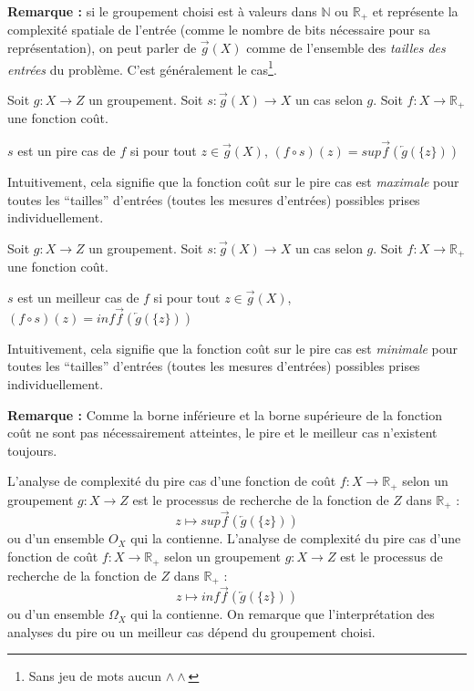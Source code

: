 \documentclass[../../../main.tex]{subfiles}
\begin{document}
\textbf{Remarque :} si le groupement choisi est à valeurs dans $\mathbb{N}$ ou $\mathbb{R}_+$ et représente la complexité spatiale de l'entrée (comme le nombre de bits nécessaire pour sa représentation), on peut parler de $\overrightarrow{g}(X)$ comme de l'ensemble des \textit{tailles des entrées} du problème. C'est généralement le cas\footnote{Sans jeu de mots aucun $\wedge\wedge$}.
 {
	Soit $g:X\rightarrow Z$ un groupement. Soit $s:\overrightarrow{g}(X)\rightarrow X$ un cas selon $g$. Soit $f:X\rightarrow \mathbb{R}_+$ une fonction coût. \newline

	$s$ est un pire cas de $f$ si pour tout $z\in\overrightarrow{g}(X)$, $(f\circ s)(z) = sup \overrightarrow{f}\left(\overleftarrow{g}\left(\{z\}\right)\right)$
}
Intuitivement, cela signifie que la fonction coût sur le pire cas est \textit{maximale} pour toutes les ``tailles'' d'entrées (toutes les mesures d'entrées) possibles prises individuellement.
 {
	Soit $g:X\rightarrow Z$ un groupement. Soit $s:\overrightarrow{g}(X)\rightarrow X$ un cas selon $g$. Soit $f:X\rightarrow \mathbb{R}_+$ une fonction coût. \newline

	$s$ est un meilleur cas de $f$ si pour tout $z\in\overrightarrow{g}(X)$, $(f\circ s)(z) = inf \overrightarrow{f}(\overleftarrow{g}(\{z\}))$
}
Intuitivement, cela signifie que la fonction coût sur le pire cas est \textit{minimale} pour toutes les ``tailles'' d'entrées (toutes les mesures d'entrées) possibles prises individuellement.

\textbf{Remarque :} Comme la borne inférieure et la borne supérieure de la fonction coût ne sont pas nécessairement atteintes, le pire et le meilleur cas n'existent toujours.

 {
	L'analyse de complexité du pire cas d'une fonction de coût $f:X\rightarrow \mathbb{R}_+$ selon un groupement $g:X\rightarrow Z$ est le processus de recherche de la fonction de $Z$ dans $\mathbb{R}_+$ :
	$$z\mapsto sup \overrightarrow{f}\left(\overleftarrow{g}\left(\{z\}\right)\right)$$
	ou d'un ensemble $O_X$ qui la contienne.
}
 {
	L'analyse de complexité du pire cas d'une fonction de coût $f:X\rightarrow \mathbb{R}_+$ selon un groupement $g:X\rightarrow Z$ est le processus de recherche de la fonction de $Z$ dans $\mathbb{R}_+$ :
	$$z\mapsto inf \overrightarrow{f}\left(\overleftarrow{g}\left(\{z\}\right)\right)$$
	ou d'un ensemble $\Omega_X$ qui la contienne.
}
On remarque que l'interprétation des analyses du pire ou un meilleur cas dépend du groupement choisi.
\end{document}
